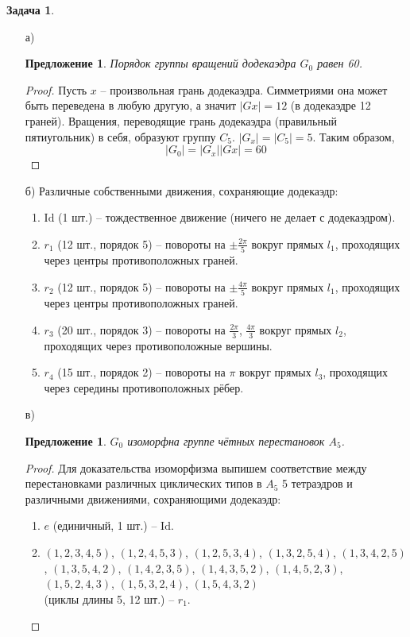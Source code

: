 \documentclass[12pt]{article}
\newtheorem{predl}[theorem]{Предложение}
\theoremstyle{definition}
\newtheorem{zad}{Задача}[section]
\begin{document}
\begin{zad}
\begin{itemize}
    \item[а)]
    \begin{predl}
        Порядок группы вращений додекаэдра $G_0$ равен 60.
    \end{predl}
    \begin{proof}
    Пусть $x$ -- произвольная грань додекаэдра. Симметриями она может быть переведена в любую другую, а значит $|Gx|=12$ (в додекаэдре 12 граней). Вращения, переводящие грань додекаэдра (правильный пятиугольник) в себя, образуют группу $C_5$. $|G_x|=|C_5|=5$. Таким образом,
    \begin{equation}
        \boxed{|G_0|=|G_x||Gx|=60}
    \end{equation}
    \end{proof}
    \item[б)] Различные собственными движения, сохраняющие додекаэдр:
    \begin{enumerate}
        \item $\text{Id}$ (1 шт.) -- тождественное движение (ничего не делает с додекаэдром).
        \item $r_1$ (12 шт., порядок 5) -- повороты на $\pm\frac{2\pi}{5}$ вокруг прямых $l_1$, проходящих через центры противоположных граней.
        \item $r_2$ (12 шт., порядок 5) -- повороты на $\pm\frac{4\pi}{5}$ вокруг прямых $l_1$, проходящих через центры противоположных граней.
        \item $r_3$ (20 шт., порядок 3) -- повороты на $\frac{2\pi}{3}$, $\frac{4\pi}{3}$ вокруг прямых $l_2$, проходящих через противоположные вершины.
        \item $r_4$ (15 шт., порядок 2) -- повороты на $\pi$ вокруг прямых $l_3$, проходящих через середины противоположных рёбер.
    \end{enumerate}
    \item[в)]
    \begin{predl}
        $G_0$ изоморфна группе чётных перестановок $A_5$.
    \end{predl}
    \begin{proof}
    Для доказательства изоморфизма выпишем соответствие между перестановками различных циклических типов в $A_5$ 5 тетраэдров и различными движениями, сохраняющими додекаэдр:
    \begin{enumerate}
        \item $e$ (единичный, 1 шт.) -- $\text{Id}$.
        \item $(1,2,3,4,5)$, $(1,2,4,5,3)$, $(1,2,5,3,4)$, $(1,3,2,5,4)$, $(1,3,4,2,5)$, $(1,3,5,4,2)$, $(1,4,2,3,5)$, $(1,4,3,5,2)$, $(1,4,5,2,3)$, $(1,5,2,4,3)$, $(1,5,3,2,4)$, $(1,5,4,3,2)$\\ (циклы длины 5, 12 шт.) -- $r_1$.

\end{enumerate}
\end{proof}
\end{itemize}
\end{zad}
\end{document}

